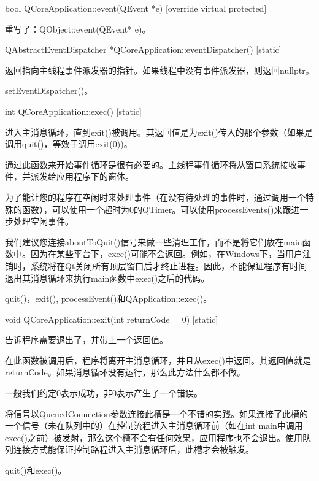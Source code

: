 bool QCoreApplication::event(QEvent *e) [override virtual protected]

重写了：QObject::event(QEvent* e)。

QAbstractEventDispatcher *QCoreApplication::eventDispatcher() [static]

返回指向主线程事件派发器的指针。如果线程中没有事件派发器，则返回nullptr。



\begin{notice}[另请参阅]
 setEventDispatcher()。
\end{notice}

int QCoreApplication::exec() [static]

进入主消息循环，直到exit()被调用。其返回值是为exit()传入的那个参数（如果是调用quit()，等效于调用exit(0))。

通过此函数来开始事件循环是很有必要的。主线程事件循环将从窗口系统接收事件，并派发给应用程序下的窗体。

为了能让您的程序在空闲时来处理事件（在没有待处理的事件时，通过调用一个特殊的函数），可以使用一个超时为0的QTimer。可以使用processEvents()来跟进一步处理空闲事件。

我们建议您连接aboutToQuit()信号来做一些清理工作，而不是将它们放在main函数中。因为在某些平台下，exec()可能不会返回。例如，在Windows下，当用户注销时，系统将在Qt关闭所有顶层窗口后才终止进程。因此，不能保证程序有时间退出其消息循环来执行main函数中exec()之后的代码。


\begin{notice}[另请参阅]
quit()，exit(), processEvent()和QApplication::exec()。

\end{notice}

void QCoreApplication::exit(int returnCode = 0) [static]

告诉程序需要退出了，并带上一个返回值。

在此函数被调用后，程序将离开主消息循环，并且从exec()中返回。其返回值就是returnCode。如果消息循环没有运行，那么此方法什么都不做。

一般我们约定0表示成功，非0表示产生了一个错误。

将信号以QueuedConnection参数连接此槽是一个不错的实践。如果连接了此槽的一个信号（未在队列中的）在控制流程进入主消息循环前（如在int main中调用exec()之前）被发射，那么这个槽不会有任何效果，应用程序也不会退出。使用队列连接方式能保证控制路程进入主消息循环后，此槽才会被触发。


\begin{notice}[另请参阅]
quit()和exec()。
\end{notice}

